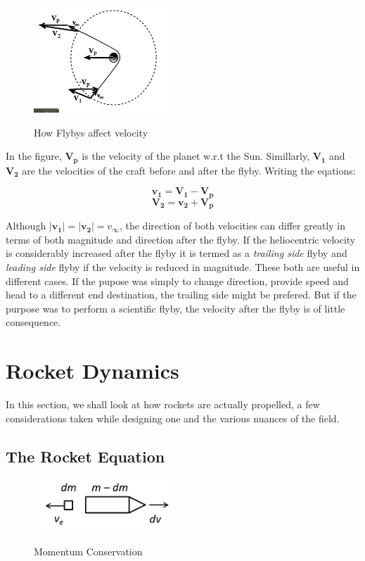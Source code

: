 \documentclass[12pt, letterpaper]{article}
\begin{document}
\begin{figure}[h!]
	\centering
    \includegraphics[width = 200px]{Flyby}
    \label{fig:Flyby}
    \caption{How Flybys affect velocity}
\end{figure}

In the figure, $\mathbf{V_p}$ is the velocity of the planet w.r.t the Sun. Simillarly, $\mathbf{V_1}$ and $\mathbf{V_2}$ are the velocities of the craft before and after the flyby. Writing the eqations:

\[
	\mathbf{v_1 = V_1  - V_p}
\]
\[
	\mathbf{V_2 = v_2  + V_p}
\]

Although $ |\mathbf{v_1}| = |\mathbf{v_2}|  = v_\infty$, the direction of both velocities can differ greatly in terms of both magnitude and direction after the flyby. If the heliocentric velocity is considerably increased after the flyby it is termed as a \textit{trailing side} flyby and \textit{leading side} flyby if the velocity is reduced in magnitude. These both are useful in different cases. If the pupose was simply to change direction, provide speed and head to a different end destination, the trailing side might be prefered. But if the purpose was to perform a scientific flyby, the velocity after the flyby is of little consequence.

\newpage
\section{Rocket Dynamics}
In this section, we shall look at how rockets are actually propelled, a few considerations taken while designing one and the various nuances of the field. 
\subsection{The Rocket Equation}

\begin{figure}[ht]
	\centering
    \includegraphics[width = 200px]{rocket_thrust}
    \label{fig:rt}
    \caption{Momentum Conservation}
\end{figure}
\end{document}
